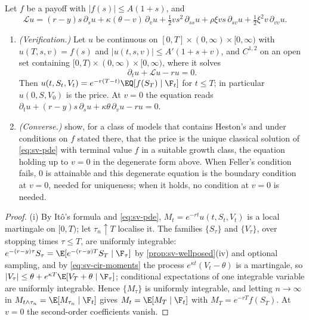 \begin{proposition}\label{prop:sv-pde}
Let $f$ be a payoff with $|f(s)|\le A(1+s)$, and
\[
  \mathcal Lu=(r-y)s\,\partial_su+\kappa(\theta-v)\,\partial_vu+\tfrac12vs^2\,\partial_{ss}u+\rho\xi vs\,\partial_{sv}u
  +\tfrac12\xi^2v\,\partial_{vv}u .
\]
\begin{enumerate}[label=(\roman*)]
  \item \emph{(Verification.)} Let $u$ be continuous on $[0,T]\times(0,\infty)\times[0,\infty)$ with
    $u(T,s,v)=f(s)$ and $|u(t,s,v)|\le A'(1+s+v)$, and $C^{1,2}$ on an open set containing
    $[0,T)\times(0,\infty)\times[0,\infty)$, where it solves
    \begin{equation}\label{eq:sv-pde}
      \partial_tu+\mathcal Lu-ru=0 .
    \end{equation}
    Then $u(t,S_t,V_t)=e^{-r(T-t)}\EQ[f(S_T)\mid\F_t]$ for $t\le T$; in particular $u(0,S,V_0)$ is the price.
    At $v=0$ the equation reads $\partial_tu+(r-y)s\,\partial_su+\kappa\theta\,\partial_vu-ru=0$.
  \item \emph{(Converse.)} \textcite{ekstrom-tysk} show, for a class of models that contains Heston's and
    under conditions on $f$ stated there, that the price is the unique classical solution of \eqref{eq:sv-pde}
    with terminal value $f$ in a suitable growth class, the equation holding up to $v=0$ in the degenerate form
    above. When Feller's condition fails, $0$ is attainable and this degenerate equation is the boundary
    condition at $v=0$, needed for uniqueness; when it holds, no condition at $v=0$ is needed.
\end{enumerate}
\end{proposition}

\begin{proof}
(i) By It\^o's formula and \eqref{eq:sv-pde}, $M_t=e^{-rt}u(t,S_t,V_t)$ is a local martingale on $[0,T)$; let
$\tau_n\uparrow T$ localise it. The families $\{S_\tau\}$ and $\{V_\tau\}$, over stopping times $\tau\le T$, are
uniformly integrable: $e^{-(r-y)\tau}S_\tau=\E[e^{-(r-y)T}S_T\mid\F_\tau]$ by
\cref{prop:sv-wellposed}(iv) and optional sampling, and by \eqref{eq:sv-cir-moments} the process
$e^{\kappa t}(V_t-\theta)$ is a martingale, so $|V_\tau|\le\theta+e^{\kappa T}\E[V_T+\theta\mid\F_\tau]$;
conditional expectations of one integrable variable are uniformly integrable. Hence $\{M_\tau\}$ is
uniformly integrable, and letting $n\to\infty$ in $M_{t\wedge\tau_n}=\E[M_{\tau_n}\mid\F_t]$ gives
$M_t=\E[M_T\mid\F_t]$ with $M_T=e^{-rT}f(S_T)$. At $v=0$ the second-order coefficients vanish.
\end{proof}

